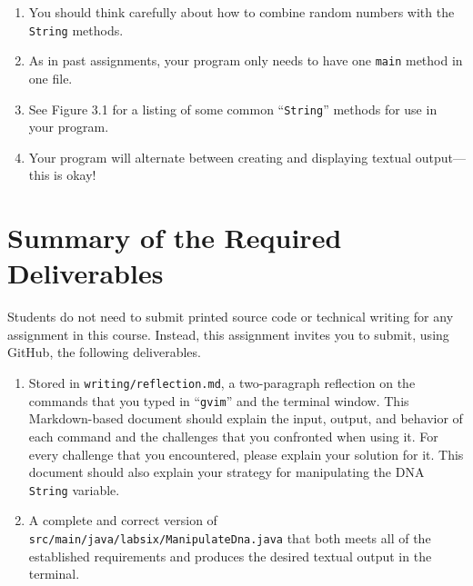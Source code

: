 \documentclass[11pt]{article}
\newcommand{\mainprogramsource}{\lstinline{src/main/java/labsix/ManipulateDna.java}}
\newcommand{\reflection}{\lstinline{writing/reflection.md}}
\newcommand{\command}[1]{``\lstinline{#1}''}
\begin{document}
\begin{enumerate}
  \setlength{\itemsep}{0pt}

\item You should think carefully about how to combine random numbers with the {\tt String} methods.

\item As in past assignments, your program only needs to have one {\tt main} method in one file.

\item See Figure 3.1 for a listing of some common \command{String} methods for use in your program.

\item Your program will alternate between creating and displaying textual output---this is okay!


\end{enumerate}

\section*{Summary of the Required Deliverables}

\noindent Students do not need to submit printed source code or technical writing for any assignment in this course.
Instead, this assignment invites you to submit, using GitHub, the following deliverables.

\begin{enumerate}

  \setlength{\itemsep}{0in}

\item Stored in \reflection{}, a two-paragraph reflection on the commands that you typed in \command{gvim} and the
  terminal window. This Markdown-based document should explain the input, output, and behavior of each command and the
  challenges that you confronted when using it. For every challenge that you encountered, please explain your solution
  for it. This document should also explain your strategy for manipulating the DNA {\tt String} variable.

\item A complete and correct version of \mainprogramsource{} that both meets all of the established requirements and
  produces the desired textual output in the terminal.

\end{enumerate}
\end{document}
